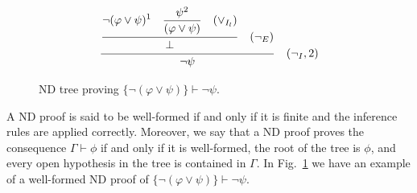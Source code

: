 \begin{figure}[h]
    \centering
    \[
    \frac{\displaystyle \frac{
    \displaystyle \neg (\varphi \lor \psi)^1 \quad \displaystyle \frac{\psi^2}{(\varphi \lor \psi) \strut} \quad (\lor_{I_l}) \strut}
    {\displaystyle \bot \strut} \quad (\displaystyle \neg_E)\strut} {\displaystyle \neg \psi \strut} \quad (\neg_I, 2)
    \]
    \caption{ND tree proving \( \{\neg (\varphi \lor \psi)\} \vdash \neg \psi \).}
    \label{tab:proof-tree}
\end{figure}

A ND proof is said to be well-formed if and only if it is finite and the inference rules are applied correctly. Moreover, we say that a ND proof proves the consequence \(\Gamma \vdash \phi\) if and only if it is well-formed, the root of the tree is \(\phi\), and every open hypothesis in the tree is contained in \(\Gamma\).
In Fig.~\ref{tab:proof-tree} we have an example of a well-formed ND proof of \( \{\neg (\varphi \lor \psi)\} \vdash \neg \psi \).


%
